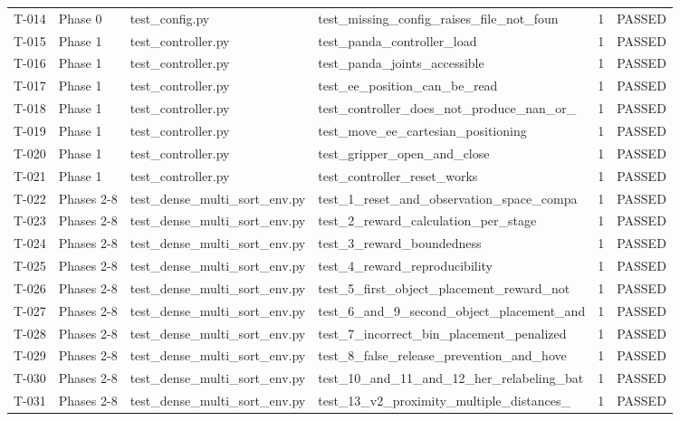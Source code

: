 \documentclass[11pt,a4paper,oneside]{book}
\begin{document}
\begin{longtable}{l l l l l l}
T-014 & Phase 0 & test\_config.py & test\_missing\_config\_raises\_file\_not\_foun & 1 & PASSED \\
T-015 & Phase 1 & test\_controller.py & test\_panda\_controller\_load & 1 & PASSED \\
T-016 & Phase 1 & test\_controller.py & test\_panda\_joints\_accessible & 1 & PASSED \\
T-017 & Phase 1 & test\_controller.py & test\_ee\_position\_can\_be\_read & 1 & PASSED \\
T-018 & Phase 1 & test\_controller.py & test\_controller\_does\_not\_produce\_nan\_or\_ & 1 & PASSED \\
T-019 & Phase 1 & test\_controller.py & test\_move\_ee\_cartesian\_positioning & 1 & PASSED \\
T-020 & Phase 1 & test\_controller.py & test\_gripper\_open\_and\_close & 1 & PASSED \\
T-021 & Phase 1 & test\_controller.py & test\_controller\_reset\_works & 1 & PASSED \\
T-022 & Phases 2-8 & test\_dense\_multi\_sort\_env.py & test\_1\_reset\_and\_observation\_space\_compa & 1 & PASSED \\
T-023 & Phases 2-8 & test\_dense\_multi\_sort\_env.py & test\_2\_reward\_calculation\_per\_stage & 1 & PASSED \\
T-024 & Phases 2-8 & test\_dense\_multi\_sort\_env.py & test\_3\_reward\_boundedness & 1 & PASSED \\
T-025 & Phases 2-8 & test\_dense\_multi\_sort\_env.py & test\_4\_reward\_reproducibility & 1 & PASSED \\
T-026 & Phases 2-8 & test\_dense\_multi\_sort\_env.py & test\_5\_first\_object\_placement\_reward\_not & 1 & PASSED \\
T-027 & Phases 2-8 & test\_dense\_multi\_sort\_env.py & test\_6\_and\_9\_second\_object\_placement\_and & 1 & PASSED \\
T-028 & Phases 2-8 & test\_dense\_multi\_sort\_env.py & test\_7\_incorrect\_bin\_placement\_penalized & 1 & PASSED \\
T-029 & Phases 2-8 & test\_dense\_multi\_sort\_env.py & test\_8\_false\_release\_prevention\_and\_hove & 1 & PASSED \\
T-030 & Phases 2-8 & test\_dense\_multi\_sort\_env.py & test\_10\_and\_11\_and\_12\_her\_relabeling\_bat & 1 & PASSED \\
T-031 & Phases 2-8 & test\_dense\_multi\_sort\_env.py & test\_13\_v2\_proximity\_multiple\_distances\_ & 1 & PASSED \\

\end{longtable}
\end{document}
